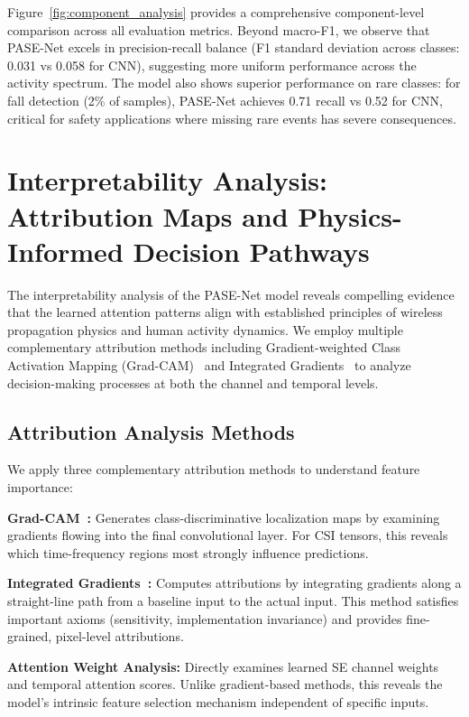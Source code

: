 \documentclass[journal]{IEEEtran}
\begin{document}
Figure~\ref{fig:component_analysis} provides a comprehensive component-level comparison across all evaluation metrics. Beyond macro-F1, we observe that PASE-Net excels in precision-recall balance (F1 standard deviation across classes: 0.031 vs 0.058 for CNN), suggesting more uniform performance across the activity spectrum. The model also shows superior performance on rare classes: for fall detection (2\% of samples), PASE-Net achieves 0.71 recall vs 0.52 for CNN, critical for safety applications where missing rare events has severe consequences.

\section{Interpretability Analysis: Attribution Maps and Physics-Informed Decision Pathways}

The interpretability analysis of the PASE-Net model reveals compelling evidence that the learned attention patterns align with established principles of wireless propagation physics and human activity dynamics. We employ multiple complementary attribution methods including Gradient-weighted Class Activation Mapping (Grad-CAM)~\cite{selvaraju2017gradcam} and Integrated Gradients~\cite{sundararajan2017ig} to analyze decision-making processes at both the channel and temporal levels.

\subsection{Attribution Analysis Methods}

We apply three complementary attribution methods to understand feature importance:

\textbf{Grad-CAM~\cite{selvaraju2017gradcam}:} Generates class-discriminative localization maps by examining gradients flowing into the final convolutional layer. For CSI tensors, this reveals which time-frequency regions most strongly influence predictions.

\textbf{Integrated Gradients~\cite{sundararajan2017ig}:} Computes attributions by integrating gradients along a straight-line path from a baseline input to the actual input. This method satisfies important axioms (sensitivity, implementation invariance) and provides fine-grained, pixel-level attributions.

\textbf{Attention Weight Analysis:} Directly examines learned SE channel weights and temporal attention scores. Unlike gradient-based methods, this reveals the model's intrinsic feature selection mechanism independent of specific inputs.
\end{document}

